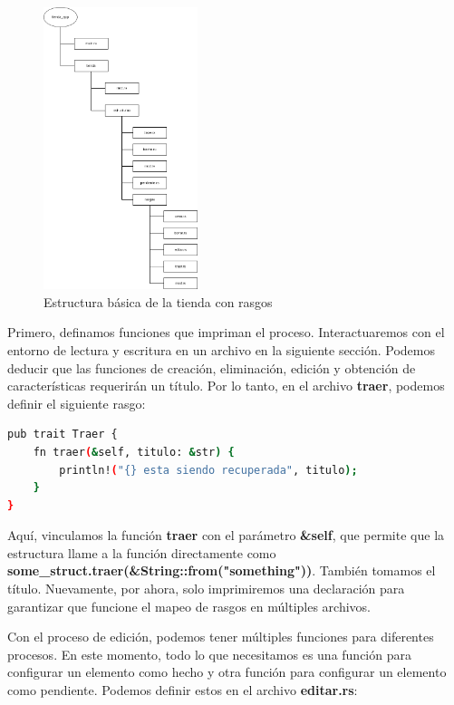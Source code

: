 \begin{figure}[htb]
	\centering
	\includegraphics[width=0.4\textwidth]{capitulo1/estructura_tienda2.png}
	\caption{Estructura básica de la tienda con rasgos}
	\label{cap1:003}
\end{figure} 

Primero, definamos funciones que impriman el proceso. Interactuaremos con el entorno de lectura y escritura en un archivo en la siguiente sección. Podemos deducir que las funciones de creación, eliminación, edición y obtención de características requerirán un título. Por lo tanto, en el archivo \textbf{traer}, podemos definir el siguiente rasgo:


\begin{lstlisting}[language=bash]
pub trait Traer {
	fn traer(&self, titulo: &str) {
		println!("{} esta siendo recuperada", titulo);
	}
}	
\end{lstlisting}


Aquí, vinculamos la función \textbf{traer} con el parámetro \textbf{\&self}, que permite que la estructura llame a la función directamente como \textbf{some\_struct.traer(\&String::from("something"))}. También tomamos el título. Nuevamente, por ahora, solo imprimiremos una declaración para garantizar que funcione el mapeo de rasgos en múltiples archivos.

Con el proceso de edición, podemos tener múltiples funciones para diferentes procesos. En este momento, todo lo que necesitamos es una función para configurar un elemento como hecho y otra función para configurar un elemento como pendiente. Podemos definir estos en el archivo \textbf{editar.rs}:

